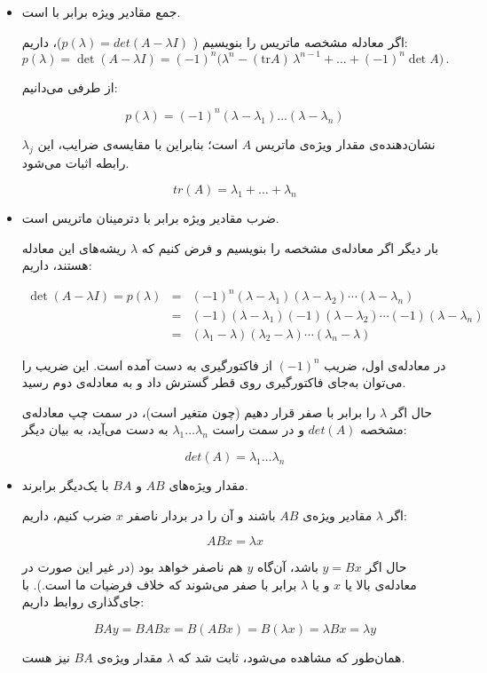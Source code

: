 
\begin{itemize}
	\item جمع مقادیر ویژه برابر با   است.
	
	اگر معادله مشخصه ماتریس را بنویسیم (
	$p(\lambda) = det(A - \lambda I)$)، 
	داریم:
	$$ p(\lambda) = \det(A - \lambda I) = (-1)^n \big(\lambda^n - (\text{tr} A) \, \lambda ^{n-1} + \dots + (-1)^n \det A\big)\,.$$
	 
	 از طرفی می‌دانیم:
	 
	 $$p(\lambda) = (-1)^n(\lambda - \lambda_1) \dots (\lambda - \lambda_n)$$
	 
	 $\lambda_j$ نشان‌دهنده‌ی مقدار ویژه‌ی ماتریس $A$ است؛ بنابراین با مقایسه‌ی ضرایب، این رابطه اثبات می‌شود.
	 
	 $$tr(A) = \lambda_1 + \dots + \lambda_n$$
	 
	 \item ضرب مقادیر ویژه برابر با دترمینان ماتریس است.
	 
	 بار دیگر اگر معادله‌ی مشخصه را بنویسیم و فرض کنیم که $\lambda$ ریشه‌های این معادله هستند، داریم:
	 
	 $$
	 \begin{array}{rcl} \det (A-\lambda I)=p(\lambda)&=&(-1)^n (\lambda - \lambda_1 )(\lambda - \lambda_2)\cdots (\lambda - \lambda_n) \\ &=&(-1) (\lambda - \lambda_1 )(-1)(\lambda - \lambda_2)\cdots (-1)(\lambda - \lambda_n) \\ &=&(\lambda_1 - \lambda )(\lambda_2 - \lambda)\cdots (\lambda_n - \lambda)
	 \end{array}
	 $$
	 
	 در معادله‌ی اول، ضریب $(-1)^n$ از فاکتورگیری به دست آمده است. این ضریب را می‌توان به‌جای فاکتورگیری روی قطر گسترش داد و به معادله‌ی دوم رسید. 
	 
	 حال اگر $\lambda$ را برابر با صفر قرار دهیم (چون متغیر است)،‌ در سمت چپ معادله‌ی مشخصه $det(A)$ و در سمت راست $\lambda_1 \dots \lambda_n$ به دست می‌آید، به بیان دیگر:
	 
	 $$det(A) = \lambda_1 \dots \lambda_n$$
	 
	 \item مقدار ویژه‌های $AB$ و $BA$ با یک‌دیگر برابرند.

	 اگر $\lambda$ مقادیر ویژه‌ی $AB$ باشند و آن را در بردار ناصفر $x$ ضرب کنیم، داریم:
	 
	 $$ABx = \lambda x$$
	 
	 حال اگر $y = Bx$ باشد، آن‌گاه $y$ هم ناصفر خواهد بود (در غیر این صورت در معادله‌ی بالا یا $x$ و یا $\lambda$ برابر با صفر می‌شوند که خلاف فرضیات ما است.). با جای‌گذاری روابط داریم:
	 
	 $$BAy=BABx=B(ABx)=B( \lambda x)=\lambda Bx = \lambda y$$
	 
	 همان‌طور که مشاهده می‌شود، ثابت شد که $\lambda$ مقدار ویژه‌ی $BA$ نیز هست.
\end{itemize}


